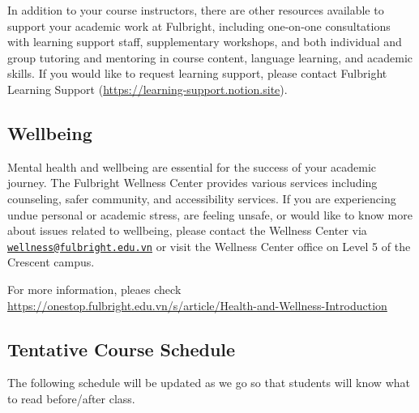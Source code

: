 \documentclass[
]{article}
\begin{document}
In addition to your course instructors, there are other resources available to support your
academic work at Fulbright, including one-on-one consultations with learning support staff,
supplementary workshops, and both individual and group tutoring and mentoring in course
content, language learning, and academic skills. If you would like to request learning support,
please contact Fulbright Learning Support (\url{https://learning-support.notion.site}).

\hypertarget{wellbeing}{%
\subsection*{Wellbeing}\label{wellbeing}}

Mental health and wellbeing are essential for the success of your academic journey. The
Fulbright Wellness Center provides various services including counseling, safer community,
and accessibility services. If you are experiencing undue personal or academic stress, are
feeling unsafe, or would like to know more about issues related to wellbeing, please contact
the Wellness Center via \href{mailto:wellness@fulbright.edu.vn}{\nolinkurl{wellness@fulbright.edu.vn}} or visit the Wellness Center office on
Level 5 of the Crescent campus.

For more information, pleaes check
\url{https://onestop.fulbright.edu.vn/s/article/Health-and-Wellness-Introduction}

\newpage

\hypertarget{tentative-course-schedule}{%
\subsection*{Tentative Course Schedule}\label{tentative-course-schedule}}

The following schedule will be updated as we go so that students will know what to read
before/after class.
\end{document}
